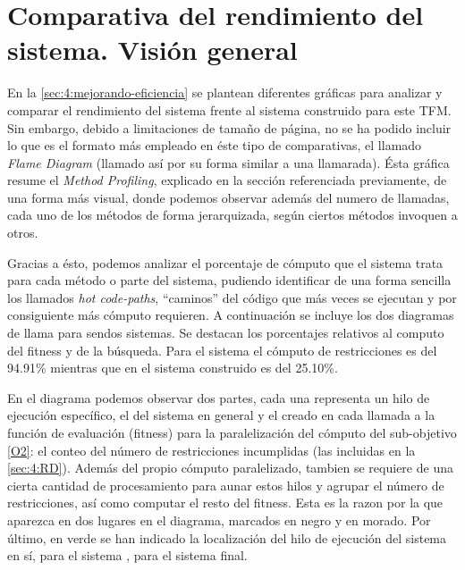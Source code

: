 \graphicspath{{anexos/AnexoC-Flame-Diagram/recursos/}}

\section{Comparativa del rendimiento del sistema. Visión general} \label{Anexo:flame-diagram}

En la \autoref{sec:4:mejorando-eficiencia} se plantean diferentes gráficas para analizar y comparar el rendimiento del sistema \legacy{} frente al sistema construido para este TFM. Sin embargo, debido a limitaciones de tamaño de página, no se ha podido incluir lo que es el formato más empleado en éste tipo de comparativas, el llamado \textit{Flame Diagram} (llamado así por su forma similar a una llamarada). Ésta gráfica resume el \textit{Method Profiling}, explicado en la sección referenciada previamente, de una forma más visual, donde podemos observar además del numero de llamadas, cada uno de los métodos de forma jerarquizada, según ciertos métodos invoquen a otros.

Gracias a ésto, podemos analizar el porcentaje de cómputo que el sistema trata para cada método o parte del sistema, pudiendo identificar de una forma sencilla los llamados \textit{hot code-paths}, ``caminos'' del código que más veces se ejecutan y por consiguiente más cómputo requieren. A continuación se incluye los dos diagramas de llama para sendos sistemas. Se destacan los porcentajes relativos al computo del fitness y de la búsqueda. Para el sistema \legacy{} el cómputo de restricciones es del 94.91\% mientras que en el sistema construido es del 25.10\%.

En el diagrama podemos observar dos partes, cada una representa un hilo de ejecución específico, el del sistema en general y el creado en cada llamada a la función de evaluación (fitness) para la paralelización del cómputo del sub-objetivo \ref{O2}: el conteo del número de restricciones incumplidas (las incluidas en la \autoref{sec:4:RD}). Además del propio cómputo paralelizado, tambien se requiere de una cierta cantidad de procesamiento para aunar estos hilos y agrupar el número de restricciones, así como computar el resto del fitness. Esta es la razon por la que aparezca en dos lugares en el diagrama, marcados en negro y en morado.
Por último, en verde se han indicado la localización del hilo de ejecución del sistema en sí, \sa{} para el sistema \legacy{}, \vns{} para el sistema final.

